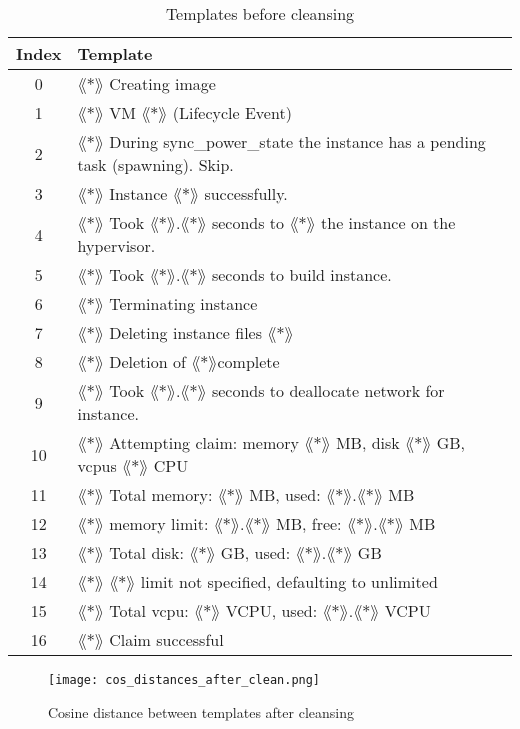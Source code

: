 \begin{table}[ht]
\begin{small}
\begin{tabular}{ c l } 
\toprule
Index & Template \\
\midrule
0 & $\lang*\rang$ Creating image\\
1 & $\lang*\rang$ VM $\lang*\rang$ (Lifecycle Event)\\
2 & $\lang*\rang$ During sync\_power\_state the instance has a pending task (spawning). Skip.\\
3 & $\lang*\rang$ Instance $\lang*\rang$ successfully.\\
4 & $\lang*\rang$ Took $\lang*\rang$.$\lang*\rang$ seconds to $\lang*\rang$ the instance on the hypervisor.\\
5 & $\lang*\rang$ Took $\lang*\rang$.$\lang*\rang$ seconds to build instance.\\
6 & $\lang*\rang$ Terminating instance\\
7 & $\lang*\rang$ Deleting instance files $\lang*\rang$\\
8 & $\lang*\rang$ Deletion of $\lang*\rang$complete\\
9 & $\lang*\rang$ Took $\lang*\rang$.$\lang*\rang$ seconds to deallocate network for instance.\\
10 & $\lang*\rang$ Attempting claim: memory $\lang*\rang$ MB, disk $\lang*\rang$ GB, vcpus $\lang*\rang$ CPU\\
11 & $\lang*\rang$ Total memory: $\lang*\rang$ MB, used: $\lang*\rang$.$\lang*\rang$ MB\\
12 & $\lang*\rang$ memory limit: $\lang*\rang$.$\lang*\rang$ MB, free: $\lang*\rang$.$\lang*\rang$ MB\\
13 & $\lang*\rang$ Total disk: $\lang*\rang$ GB, used: $\lang*\rang$.$\lang*\rang$ GB\\
14 & $\lang*\rang$ $\lang*\rang$ limit not specified, defaulting to unlimited\\
15 & $\lang*\rang$ Total vcpu: $\lang*\rang$ VCPU, used: $\lang*\rang$.$\lang*\rang$ VCPU\\
16 & $\lang*\rang$ Claim successful\\
\bottomrule
\end{tabular}
\caption{Templates before cleansing}
\label{tab:templates_before_cleansing}
\end{small}
\end{table}

\begin{figure}[h]
  \centering
  \texttt{[image: cos\_distances\_after\_clean.png]}\\
  \caption{Cosine distance between templates after cleansing}
  \label{fig:cos_distance_after_cleansing}
\end{figure}

